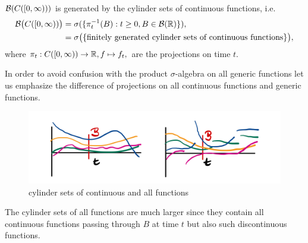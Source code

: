 \begin{llemma}
\begin{prop}
	$\mathcal{B} ( C([0,\infty)))$ is generated by the cylinder sets of continuous functions, i.e. 
	\begin{align*}
		\mathcal{B} \big( C([0,\infty))\big) &= \sigma( \{\pi_t^{-1}(B):t \geq 0, B\in  \mathcal B(\mathbb{R}) \}),\\
				&= \sigma \big( \{ \text{finitely generated cylinder sets of continuous functions} \}\big),
	\end{align*}
	where $\pi_t:C([0,\infty))\to \mathbb{R}, f\mapsto f_t,$ are the projections on time $t$.
\end{prop}
\end{llemma}
In order to avoid confusion with the product $\sigma$-algebra on all generic functions let us emphasize the difference of projections on all continuous functions and generic functions. 
\begin{figure}[h]
	\begin{center}
		\includegraphics[scale=0.07]{box7.jpeg}
		\caption*{cylinder sets of continuous and all functions}
	\end{center}
\end{figure}
The cylinder sets of all functions are much larger since they contain all continuous functions passing through $B$ at time $t$ but also such discontinuous functions.
